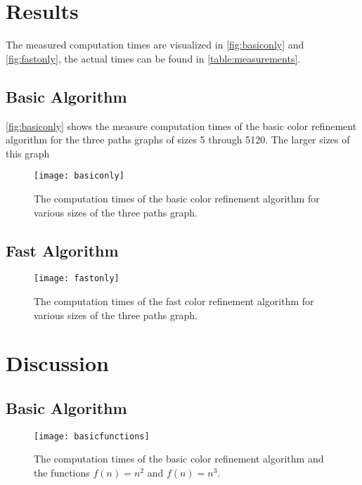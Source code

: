 \documentclass[twoside]{article}
\begin{document}
\begin{multicols}{2}
\section{Results}
\label{results}
The measured computation times are visualized in \autoref{fig:basiconly} and \autoref{fig:fastonly}, the actual times can be found in \autoref{table:measurements}.

\subsection{Basic Algorithm}
\autoref{fig:basiconly} shows the measure computation times of the basic color refinement algorithm for the three paths graphs of sizes 5 through 5120. The larger sizes of this graph 

\begin{figure}[H]
	\texttt{[image: basiconly]}
	\caption{The computation times of the basic color refinement algorithm for various sizes of the three paths graph.}
	\label{fig:basiconly}
\end{figure}

\subsection{Fast Algorithm}

\begin{figure}[H]
	\texttt{[image: fastonly]}
	\caption{The computation times of the fast color refinement algorithm for various sizes of the three paths graph.}
	\label{fig:fastonly}
\end{figure}

\section{Discussion} %
\label{disc}

\subsection{Basic Algorithm}

\begin{figure}[H]
	\texttt{[image: basicfunctions]}
	\caption{The computation times of the basic color refinement algorithm and the functions $f(n)=n^2$ and $f(n)=n^3$.}
	\label{fig:basicfunctions}
\end{figure}


\end{multicols}
\end{document}
